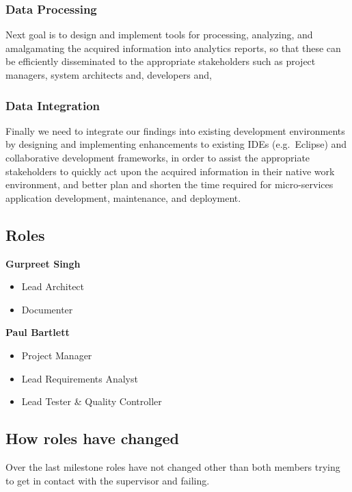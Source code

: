 \documentclass[11pt,]{article}
\begin{document}
\subsubsection{Data Processing}\label{data-processing}

Next goal is to design and implement tools for processing, analyzing,
and amalgamating the acquired information into analytics reports, so
that these can be efficiently disseminated to the appropriate
stakeholders such as project managers, system architects and, developers
and,

\subsubsection{Data Integration}\label{data-integration}

Finally we need to integrate our findings into existing development
environments by designing and implementing enhancements to existing IDEs
(e.g.~Eclipse) and collaborative development frameworks, in order to
assist the appropriate stakeholders to quickly act upon the acquired
information in their native work environment, and better plan and
shorten the time required for micro-services application development,
maintenance, and deployment.

\subsection{Roles}\label{roles}

\textbf{Gurpreet Singh}

\begin{itemize}
\item
  Lead Architect
\item
  Documenter
\end{itemize}

\textbf{Paul Bartlett}

\begin{itemize}
\item
  Project Manager
\item
  Lead Requirements Analyst
\item
  Lead Tester \& Quality Controller
\end{itemize}

\subsection{How roles have changed}\label{how-roles-have-changed}

Over the last milestone roles have not changed other than both members
trying to get in contact with the supervisor and failing.
\end{document}
